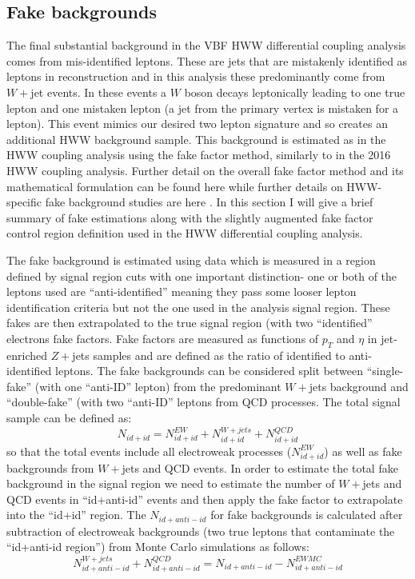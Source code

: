 \subsection{Fake backgrounds}
The final substantial background in the VBF HWW differential coupling analysis comes from mis-identified leptons. These are jets that are mistakenly identified as leptons in reconstruction and in this analysis these predominantly come from $W+$jet events. In these events a $W$ boson decays leptonically leading to one true lepton and one mistaken lepton (a jet from the primary vertex is mistaken for a lepton). This event mimics our desired two lepton signature and so creates an additional HWW background sample. This background is estimated as in the HWW coupling analysis using the fake factor method, similarly to in the 2016 HWW coupling analysis. Further detail on the overall fake factor method and its mathematical formulation can be found here \cite{fakesfactormethod} while further details on HWW-specific fake background studies are here \cite{HWWCoupling}. In this section I will give a brief summary of fake estimations along with the slightly augmented fake factor control region definition used in the HWW differential coupling analysis. 

The fake background is estimated using data which is measured in a region defined by signal region cuts with one important distinction- one or both of the leptons used are ``anti-identified'' meaning they pass some looser lepton identification criteria but not the one used in the analysis signal region. These fakes are then extrapolated to the true signal region (with two ``identified'' electrons fake factors. Fake factors are measured as functions of $p_T$ and $\eta$ in jet-enriched $Z+$jets samples and are defined as the ratio of identified to anti-identified leptons. The fake backgrounds can be considered split between ``single-fake'' (with one ``anti-ID'' lepton) from the predominant $W+$jets background and ``double-fake'' (with two ``anti-ID'' leptons from QCD processes. The total signal sample can be defined as: 
\begin{equation}
N_{id+id} = N^{EW}_{id+id}+N^{W+jets}_{id+id}+N^{QCD}_{id+id}
\end{equation} 
so that the total events include all electroweak processes ($N^{EW}_{id+id}$) as well as fake backgrounds from $W+$jets and QCD events. In order to estimate the total fake background in the signal region we need to estimate the number of $W+$jets and QCD events in ``id+anti-id'' events and then apply the fake factor to extrapolate into the ``id+id'' region. The $N_{id+anti-id}$ for fake backgrounds is calculated after subtraction of electroweak backgrounds (two true leptons that contaminate the ``id+anti-id region'') from Monte Carlo simulations as follows:
\begin{equation}
N^{W+jets}_{id+anti-id}+N^{QCD}_{id+anti-id}=N_{id+anti-id}-N^{EW MC}_{id+anti-id}
\end{equation}
 
